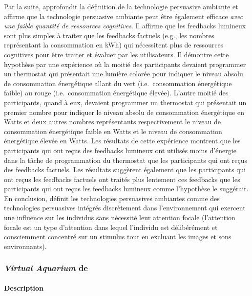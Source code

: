 \documentclass[10pt,a5paper,twoside]{article}
\begin{document}
Par la suite, \citet{ham2010ambient} approfondit la définition de la
technologie persuasive ambiante et affirme que la technologie persuasive
ambiante peut être également efficace \emph{avec une faible quantité de
ressources cognitives}. Il affirme que les feedbacks lumineux sont plus
simples à traiter que les feedbacks factuels (e.g., les nombres
représentant la consommation en kWh) qui nécessitent plus de ressources
cognitives pour être traiter et évaluer par les utilisateurs. Il
démontre cette hypothèse par une expérience où la moitié des
participants devaient programmer un thermostat qui présentait une
lumière colorée pour indiquer le niveau absolu de consommation
énergétique allant du vert (i.e.~consommation énergétique faible) au
rouge (i.e.~consommation énergétique élevée). L'autre moitié des
participants, quand à eux, devaient programmer un thermostat qui
présentait un premier nombre pour indiquer le niveau absolu de
consommation énergétique en Watts et deux autres nombres représentants
respectivement le niveau de consommation énergétique faible en Watts et
le niveau de consommation énergétique élevée en Watts. Les résultats de
cette expérience montrent que les participants qui ont reçus des
feedbacks lumineux ont utilisés moins d'énergie dans la tâche de
programmation du thermostat que les participants qui ont reçus des
feedbacks factuels. Les résultats suggèrent également que les
participants qui ont reçus les feedbacks factuels ont traités plus
lentement ces feedbacks que les participants qui ont reçus les feedbacks
lumineux comme l'hypothèse le suggérait. En conclusion,
\citet{ham2010ambient} définit les technologies persuasives ambiantes
comme des technologies persuasives intégrés discrètement dans
l'environnement qui exercent une influence sur les individus sans
nécessité leur attention focale (l'attention focale est un type
d'attention dans lequel l'individu est délibérément et consciemment
concentré sur un stimulus tout en excluant les images et sons
environnants).

\subsubsection{\emph{Virtual Aquarium} de
\citet{nakajima2008reflecting}}\label{virtual-aquarium-de-nakajima2008reflecting}

\paragraph{Description}\label{description}
\end{document}
